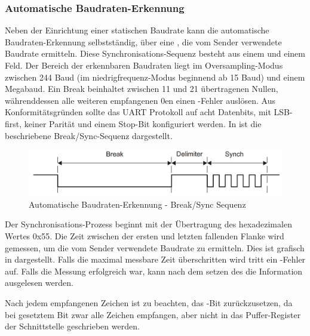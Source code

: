 \newpage
\subsubsection{Automatische Baudraten-Erkennung}
\label{sec:auto_baud}

Neben der Einrichtung einer statischen Baudrate kann die automatische Baudraten-Erkennung selbstst\"andig, \"uber eine , die vom Sender verwendete Baudrate ermitteln. Diese Synchronisations-Sequenz besteht aus einem  und einem  Feld. Der Bereich der erkennbaren Baudraten liegt im Oversampling-Modus zwischen 244 Baud (im niedrigfrequenz-Modus beginnend ab 15 Baud) und einem Megabaud. Ein Break beinhaltet zwischen 11 und 21 \"ubertragenen Nullen, w\"ahrenddessen alle weiteren empfangenen 0en einen -Fehler ausl\"osen. Aus Konformit\"atsgr\"unden sollte das UART Protokoll auf acht Datenbits, mit LSB-first, keiner Parit\"at und einem Stop-Bit konfiguriert werden. In  ist die beschriebene Break/Sync-Sequenz dargestellt.

\begin{figure}[h!]
	\centering
	\includegraphics[width=1.0\textwidth]{../Bilder/auto_baud.png}
	\caption{Automatische Baudraten-Erkennung - Break/Sync Sequenz\\}
	\label{fig:auto_baud}
\end{figure}

Der Synchronisations-Prozess beginnt mit der \"Ubertragung des hexadezimalen Wertes 0x55. Die Zeit zwischen der ersten und letzten fallenden Flanke wird gemessen, um die vom Sender verwendete Baudrate zu ermitteln. Dies ist grafisch in  dargestellt. Falls die maximal messbare Zeit \"uberschritten wird tritt ein -Fehler auf. Falls die Messung erfolgreich war, kann nach dem setzen des  die Information ausgelesen werden. 

Nach jedem empfangenen Zeichen ist zu beachten, das -Bit zur\"uckzusetzen, da bei gesetztem Bit zwar alle Zeichen empfangen, aber nicht in das Puffer-Register der Schnittstelle geschrieben werden. 

